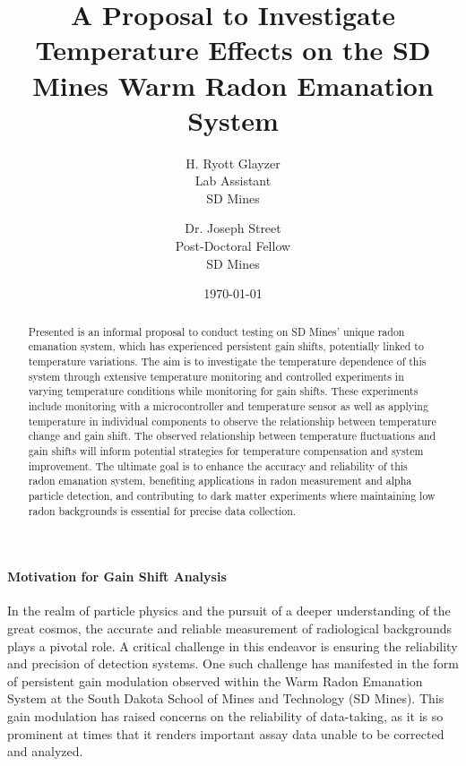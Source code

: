\documentclass[letterpaper,12pt]{article}
\title{A Proposal to Investigate Temperature Effects on the SD Mines
Warm Radon Emanation System}
\author{H. Ryott Glayzer \\
    Lab Assistant \\
    SD Mines \\ 
    \and
    Dr. Joseph Street \\
    Post-Doctoral Fellow \\
    SD Mines\\
    }
\date{\today}
\begin{document}
\maketitle

\begin{abstract}
    Presented is an informal proposal to conduct testing on SD Mines' unique
    radon emanation system, which has experienced persistent gain shifts,
    potentially linked to temperature variations.
    The aim is to investigate the temperature dependence of this system through
    extensive temperature monitoring and
    controlled experiments in varying temperature conditions while monitoring
    for gain shifts.
    These experiments include monitoring with a microcontroller and 
    temperature sensor as well as applying temperature in individual 
    components to observe the relationship between temperature change and 
    gain shift.
    The observed relationship between temperature fluctuations
    and gain shifts will inform potential strategies for temperature
    compensation and system improvement.
    The ultimate goal is to enhance the accuracy and reliability of this radon
    emanation system, benefiting applications in radon measurement and
    alpha particle detection, and contributing to dark matter experiments
    where maintaining low radon backgrounds is essential for precise data collection.
\end{abstract}

\paragraph*{Motivation for Gain Shift Analysis}
In the realm of particle physics and the pursuit of a deeper understanding of
the great cosmos, the accurate and reliable measurement of radiological 
backgrounds plays a pivotal role.
A critical challenge in this endeavor is ensuring the reliability and precision
of detection systems. 
One such challenge has manifested in the form of persistent gain modulation
observed within the Warm Radon Emanation System at the South Dakota
School of Mines and Technology (SD Mines). 
This gain modulation has raised concerns on the reliability of data-taking, as 
it is so prominent at times that it renders important assay data unable to be
corrected and analyzed. 
\end{document}
